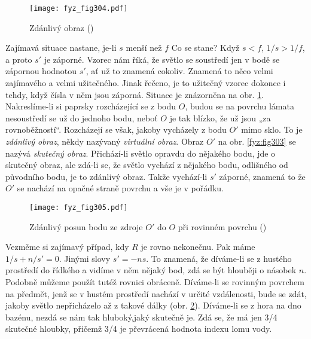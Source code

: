 {    \begin{figure}[ht!] %
      \centering
      \texttt{[image: fyz\_fig304.pdf]}
      \caption{Zdánlivý obraz
               (\cite[s.~361]{Feynman01})}
      \label{fyz:fig304}
    \end{figure}
    
    Zajímavá situace nastane, je-li \(s\) menší než \(f\) Co se stane? Když \(s<f\), \(1/s>1/f\), a 
    proto \(s'\) je záporné. Vzorec nám říká, že světlo se soustředí jen v bodě se zápornou 
    hodnotou \(s'\), ať už to znamená cokoliv. Znamená to něco velmi zajímavého a velmi užitečného. 
    Jinak řečeno, je to užitečný vzorec dokonce i tehdy, když čísla v něm jsou záporná. Situace je 
    znázorněna na obr. \ref{fyz:fig304}. Nakreslíme-li si paprsky rozcházející se z bodu \(O\), 
    budou se na povrchu lámata nesoustředí se už do jednoho bodu, neboť \(O\) je tak blízko, že už 
    jsou „za rovnoběžností“. Rozcházejí se však, jakoby vycházely z bodu \(O'\) mimo sklo. To je 
    \emph{zdánlivý obraz}, někdy nazývaný \emph{virtuální obraz}.  Obraz \(O'\) na obr. 
    \ref{fyz:fig303} se nazývá \emph{skutečný obraz}. Přichází-li světlo opravdu do nějakého bodu, 
    jde o skutečný obraz, ale zdá-li se, že světlo vychází z nějakého bodu, odlišného od původního 
    bodu, je to zdánlivý obraz. Takže vychází-li \(s'\) záporné, znamená to že \(O'\) se nachází na 
    opačné straně povrchu a vše je v pořádku.
    

    \begin{figure}[ht!] %
      \centering
      \texttt{[image: fyz\_fig305.pdf]}
      \caption{Zdánlivý posun bodu ze zdroje \(O'\) do \(O\) při rovinném povrchu
               (\cite[s.~361]{Feynman01})}
      \label{fyz:fig305}
    \end{figure}
    
    Vezměme si zajímavý případ, kdy \(R\) je rovno nekonečnu. Pak máme \(1/s + n/s' = 0\). Jinými 
    slovy \(s' = -ns\). To znamená, že díváme-li se z hustého prostředí do řídkého a vidíme v něm 
    nějaký bod, zdá se být hlouběji o násobek \(n\). Podobně můžeme použít tutéž rovnici obráceně. 
    Díváme-li se rovinným povrchem na předmět, jenž se v hustém prostředí nachází v určité 
    vzdálenosti, bude se zdát, jakoby světlo nepřicházelo až z takové dálky (obr. 
    \ref{fyz:fig305}). Díváme-li se z hora na dno bazénu, nezdá se nám tak hluboký,jaký skutečně 
    je. Zdá se, že má jen \num{3/4} skutečné hloubky, přičemž \num{3/4} je převrácená hodnota 
    indexu lomu vody.
    
}
